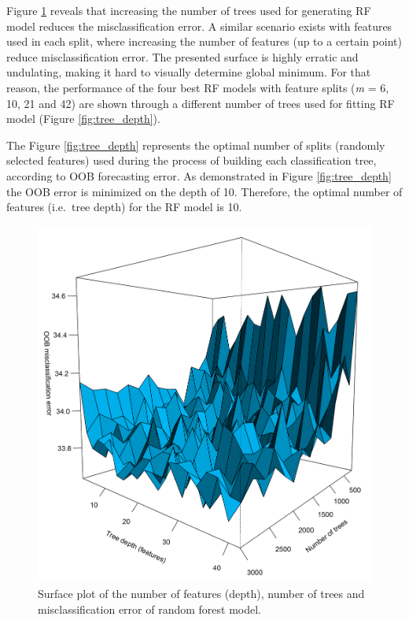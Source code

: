 \documentclass[preprint, 3p,
authoryear]{elsarticle} %
\begin{document}
Figure \ref{fig:surface} reveals that increasing the number of trees
used for generating RF model reduces the misclassification error. A
similar scenario exists with features used in each split, where
increasing the number of features (up to a certain point) reduce
misclassification error. The presented surface is highly erratic and
undulating, making it hard to visually determine global minimum. For
that reason, the performance of the four best RF models with feature
splits (\emph{m} = 6, 10, 21 and 42) are shown through a different
number of trees used for fitting RF model (Figure \ref{fig:tree_depth}).

The Figure \ref{fig:tree_depth} represents the optimal number of splits
(randomly selected features) used during the process of building each
classification tree, according to OOB forecasting error. As demonstrated
in Figure \ref{fig:tree_depth} the OOB error is minimized on the depth
of 10. Therefore, the optimal number of features (i.e.~tree depth) for
the RF model is 10.

\begin{figure}[H]

{\centering \includegraphics[width=0.7\linewidth]{img/Fig_persp} 

}

\caption{Surface plot of the number of features (depth), number of trees and misclassification error of random forest model.}\label{fig:surface}
\end{figure}
\end{document}
